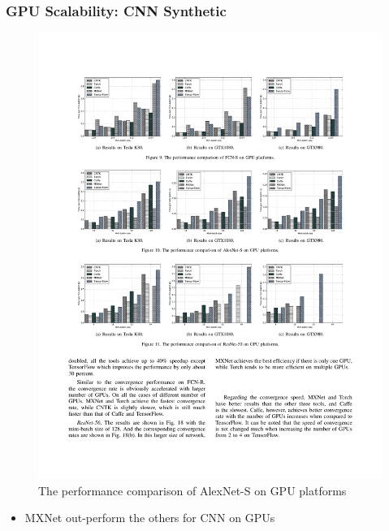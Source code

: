 \begin{frame}
	\MyLogo
	\frametitle{GPU Scalability: CNN Synthetic}

	\begin{figure}[htbp] 
		\includegraphics[width=\linewidth]{figures/AlexNet-S2.pdf} 
		\caption{The performance comparison of AlexNet-S on GPU platforms}
	\end{figure}

\vskip -10pt
\begin{mdframed}[style=mystyle1]
\begin{itemize}
\item MXNet out-perform the others for CNN on GPUs
\end{itemize}
\end{mdframed}

\end{frame}


